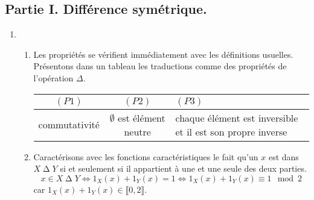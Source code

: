 \subsection*{Partie I. Différence symétrique.}
\begin{enumerate}
 \item \begin{enumerate}
 \item Les propriétés se vérifient immédiatement avec les définitions usuelles. Présentons dans un tableau les traductions comme des propriétés de l'opération $\Delta$. 
\begin{center}
\renewcommand{\arraystretch}{1.1}
\begin{tabular}{c|c|p{5cm}}
$(P1)$ & $(P2)$ & $(P3)$ \\ \hline
commutativité & $\emptyset$ est élément neutre & chaque élément est inversible et il est son propre inverse
\end{tabular}
\end{center}
  \item Caractérisons avec les fonctions caractéristiques le fait qu'un $x$ est dans $X \mathop{\Delta} Y$ si et seulement si il appartient à une et une seule des deux parties.
\begin{displaymath}
  x \in X \mathop{\Delta} Y \Leftrightarrow 1_X(x) + 1_Y(x) = 1 \Leftrightarrow 1_X(x) + 1_Y(x) \equiv 1 \mod 2
\end{displaymath}
car $1_X(x) + 1_Y(x)\in \llbracket 0, 2 \rrbracket$. 
\end{enumerate}


\end{enumerate}
